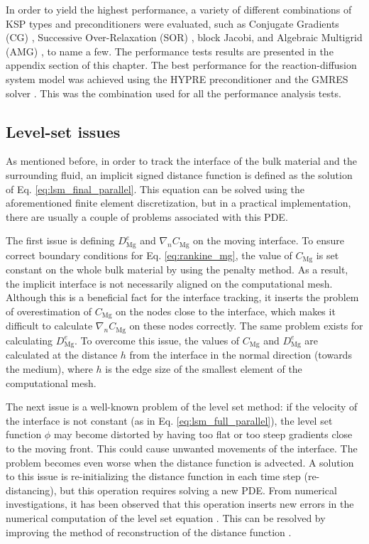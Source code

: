In order to yield the highest performance, a variety of different combinations of {KSP} types and preconditioners were evaluated, such as Conjugate Gradients ({CG}) \cite{hestenes1952}, Successive Over-Relaxation ({SOR}) \cite{habetler1961}, block Jacobi, and Algebraic Multigrid ({AMG}) \cite{mccormick1987}, to name a few. The performance tests results are presented in the appendix section of this chapter. The best performance for the reaction-diffusion system model was achieved using the HYPRE preconditioner \cite{Falgout2002} and the {GMRES} solver \cite{Saad1986}. This was the combination used for all the performance analysis tests.


\subsection{Level-set issues}  \label{sec:hpc_ls_issues}


As mentioned before, in order to track the interface of the bulk material and the surrounding fluid, an implicit signed distance function is defined as the solution of Eq. \ref{eq:lsm_final_parallel}. This equation can be solved using the aforementioned finite element discretization, but in a practical implementation, there are usually a couple of problems associated with this {PDE}.

The first issue is defining $D_{\mathrm{Mg}}^{e}$ and $\nabla_{n} C_\mathrm{Mg}$ on the moving interface. To ensure correct boundary conditions for Eq. \ref{eq:rankine_mg}, the value of $C_\mathrm{Mg}$ is set constant on the whole bulk material by using the penalty method. As a result, the implicit interface is not necessarily aligned on the computational mesh. Although this is a beneficial fact for the interface tracking, it inserts the problem of overestimation of $C_\mathrm{Mg}$ on the nodes close to the interface, which makes it difficult to calculate $\nabla_{n} C_\mathrm{Mg}$ on these nodes correctly. The same problem exists for calculating $D_{\mathrm{Mg}}^{e}$. To overcome this issue, the values of $C_\mathrm{Mg}$ and $D_{\mathrm{Mg}}^{e}$ are calculated at the distance $h$ from the interface in the normal direction (towards the medium), where $h$ is the edge size of the smallest element of the computational mesh.

The next issue is a well-known problem of the level set method: if the velocity of the interface is not constant (as in Eq. \ref{eq:lsm_full_parallel}), the level set function $\phi$ may become distorted by having too flat or too steep gradients close to the moving front. This could cause unwanted movements of the interface. The problem becomes even worse when the distance function is advected. A solution to this issue is re-initializing the distance function in each time step (re-distancing), but this operation requires solving a new {PDE}. From numerical investigations, it has been observed that this operation inserts new errors in the numerical computation of the level set equation \cite{Russo2000}. This can be resolved by improving the method of reconstruction of the distance function \cite{Russo2000}.

